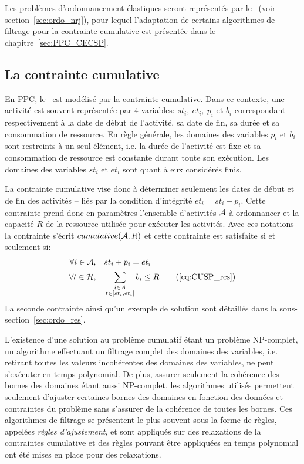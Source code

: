 Les problèmes d'ordonnancement élastiques seront représentés par le
\CECSP~(voir section~\ref{sec:ordo_nrj}), pour lequel l'adaptation
de certains algorithmes de filtrage pour la contrainte cumulative est
présentée dans le chapitre~\ref{sec:PPC_CECSP}.

\subsection{La contrainte cumulative}
\label{sec:cumu_cume}

En PPC, le \CUSP~est modélisé par la contrainte cumulative. Dans ce
contexte, une activité est souvent représentée par $4$ variables:
$st_i,\ et_i,\ p_i$ et $b_i$ correspondant respectivement à la date de
début de l'activité, sa date de fin, sa durée et sa consommation de
ressource. En règle générale, les domaines des variables $p_i$ et
$b_i$ sont restreints à un seul élément, i.e. la durée de l'activité
est fixe et sa consommation de ressource est constante durant toute
son exécution. Les domaines des variables $st_i$ et $et_i$ sont quant
à eux considérés finis.

La contrainte cumulative vise donc à déterminer seulement les dates de
début et de fin des activités -- liés par la condition d'intégrité
$et_i=st_i+p_i$. Cette contrainte prend donc en paramètres l'ensemble
d'activités ${\cal A}$ à ordonnancer et la capacité $R$ de la ressource utilisée
pour exécuter les activités. Avec ces notations la contrainte s'écrit
$cumulative({\cal A},R)$ et cette contrainte est satisfaite si et seulement 
si:
\begin{align}
  \forall i \in \A, & \quad  st_i+p_i=et_i \label{eq:CUSP_int}\\
  \forall t \in \H, &\quad \sum_{\substack{i \in A\\t \in
  [st_i,et_i[}} b_i \le R  \tag{\ref{eq:CUSP_res}} 
\end{align}
La seconde contrainte ainsi qu'un exemple de solution sont détaillés
dans la sous-section~\ref{sec:ordo_res}.

L'existence d'une solution au problème cumulatif étant un problème
NP-complet, un algorithme effectuant un filtrage complet des domaines
des variables, i.e. retirant toutes les valeurs incohérentes des
domaines des variables, ne peut s'exécuter en temps polynomial. De
plus, assurer seulement la cohérence des bornes des domaines étant
aussi NP-complet, les algorithmes utilisés permettent seulement
d'ajuster certaines bornes des domaines en fonction des
données et contraintes du problème sans s'assurer de la cohérence de
toutes les bornes. Ces algorithmes de filtrage se présentent le plus
souvent sous la forme de règles, appelées {\it règles d'ajustement},
et sont appliqués sur des relaxations de la contraintes cumulative et
des règles pouvant être appliquées en temps polynomial ont été mises
en place pour des relaxations.

